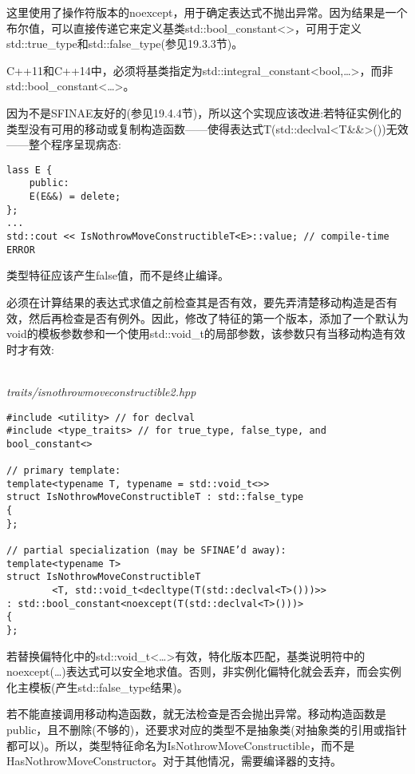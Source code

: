这里使用了操作符版本的noexcept，用于确定表达式不抛出异常。因为结果是一个布尔值，可以直接传递它来定义基类std::bool\_constant<>，可用于定义std::true\_type和std::false\_type(参见19.3.3节)。

\begin{tcolorbox}[colback=webgreen!5!white,colframe=webgreen!75!black]
\hspace*{0.75cm}C++11和C++14中，必须将基类指定为std::integral\_constant<bool,…>，而非std::bool\_constant<…>。
\end{tcolorbox}

因为不是SFINAE友好的(参见19.4.4节)，所以这个实现应该改进:若特征实例化的类型没有可用的移动或复制构造函数——使得表达式T(std::declval<T\&\&>())无效——整个程序呈现病态:

\begin{lstlisting}[style=styleCXX]
lass E {
	public:
	E(E&&) = delete;
};
...
std::cout << IsNothrowMoveConstructibleT<E>::value; // compile-time ERROR
\end{lstlisting}

类型特征应该产生false值，而不是终止编译。

必须在计算结果的表达式求值之前检查其是否有效，要先弄清楚移动构造是否有效，然后再检查是否有例外。因此，修改了特征的第一个版本，添加了一个默认为void的模板参数参和一个使用std::void\_t的局部参数，该参数只有当移动构造有效时才有效:

\hspace*{\fill} \\ %
\noindent
\textit{traits/isnothrowmoveconstructible2.hpp}
\begin{lstlisting}[style=styleCXX]
#include <utility> // for declval
#include <type_traits> // for true_type, false_type, and bool_constant<>

// primary template:
template<typename T, typename = std::void_t<>>
struct IsNothrowMoveConstructibleT : std::false_type
{
};

// partial specialization (may be SFINAE’d away):
template<typename T>
struct IsNothrowMoveConstructibleT
		<T, std::void_t<decltype(T(std::declval<T>()))>>
: std::bool_constant<noexcept(T(std::declval<T>()))>
{
};
\end{lstlisting}

若替换偏特化中的std::void\_t<…>有效，特化版本匹配，基类说明符中的noexcept(…)表达式可以安全地求值。否则，非实例化偏特化就会丢弃，而会实例化主模板(产生std::false\_type结果)。

若不能直接调用移动构造函数，就无法检查是否会抛出异常。移动构造函数是public，且不删除(不够的)，还要求对应的类型不是抽象类(对抽象类的引用或指针都可以)。所以，类型特征命名为IsNothrowMoveConstructible，而不是HasNothrowMoveConstructor。对于其他情况，需要编译器的支持。 

